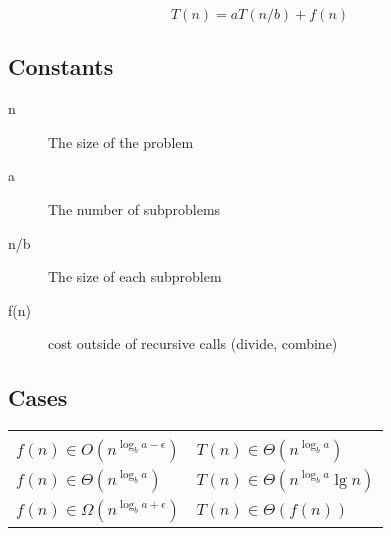 \documentclass{article}
\begin{document}
\begin{equation*}
T(n) = aT(n/b) + f(n)
\end{equation*}

\subsection{Constants}
\begin{description}
    \item [n] The size of the problem
    \item [a] The number of subproblems
    \item [n/b] The size of each subproblem
    \item [f(n)] cost outside of recursive calls (divide, combine)
\end{description}

\subsection{Cases}
\begin{tabularx}{\textwidth}{X|X}
 \hline \\
$f(n) \in O(n^{\log _b a - \epsilon})$ & $T(n) \in \Theta(n^{\log _b a})$ \\
$f(n) \in \Theta(n^{\log _b a})$ & $T(n) \in \Theta(n ^{\log _b a} \lg n)$ \\
$f(n) \in \Omega(n^{\log _b a + \epsilon})$ & $T(n) \in \Theta (f(n))$ \\
\hline
\end{tabularx}
\end{document}
